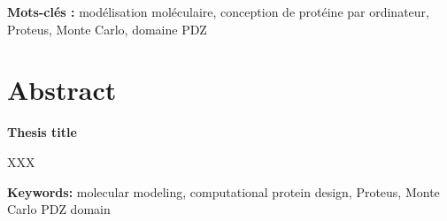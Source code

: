 \bigskip

\textbf{Mots-clés :} modélisation moléculaire, conception de protéine par ordinateur, Proteus, Monte Carlo, domaine PDZ

\vfill



\section*{Abstract}

{\large\bf\noindent Thesis title}

\bigskip

XXX

\bigskip

\textbf{Keywords:} molecular modeling, computational protein design, Proteus, Monte Carlo PDZ domain


